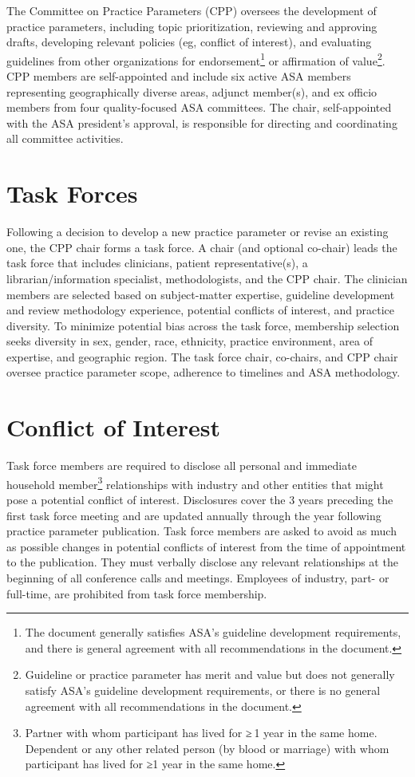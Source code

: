 \documentclass[
  letterpaper,
  DIV=11,
  numbers=noendperiod]{scrreprt}
\begin{document}
The Committee on Practice Parameters (CPP) oversees the development of
practice parameters, including topic prioritization, reviewing and
approving drafts, developing relevant policies (eg, conflict of
interest), and evaluating guidelines from other organizations for
endorsement\footnote{The document generally satisfies ASA's guideline
  development requirements, and there is general agreement with all
  recommendations in the document.} or affirmation of value\footnote{Guideline
  or practice parameter has merit and value but does not generally
  satisfy ASA's guideline development requirements, or there is no
  general agreement with all recommendations in the document.}. CPP
members are self-appointed and include six active ASA members
representing geographically diverse areas, adjunct member(s), and ex
officio members from four quality-focused ASA committees. The chair,
self-appointed with the ASA president's approval, is responsible for
directing and coordinating all committee activities.

\hypertarget{task-forces}{%
\section{Task Forces}\label{task-forces}}

Following a decision to develop a new practice parameter or revise an
existing one, the CPP chair forms a task force. A chair (and optional
co-chair) leads the task force that includes clinicians, patient
representative(s), a librarian/information specialist, methodologists,
and the CPP chair. The clinician members are selected based on
subject-matter expertise, guideline development and review methodology
experience, potential conflicts of interest, and practice diversity. To
minimize potential bias across the task force, membership selection
seeks diversity in sex, gender, race, ethnicity, practice environment,
area of expertise, and geographic region. The task force chair,
co-chairs, and CPP chair oversee practice parameter scope, adherence to
timelines and ASA methodology.

\hypertarget{conflict-of-interest}{%
\section{Conflict of Interest}\label{conflict-of-interest}}

Task force members are required to disclose all personal and immediate
household member\footnote{Partner with whom participant has lived for
  ≥ 1 year in the same home. Dependent or any other related person (by
  blood or marriage) with whom participant has lived for ≥1 year in the
  same home.} relationships with industry and other entities that might
pose a potential conflict of interest. Disclosures cover the 3 years
preceding the first task force meeting and are updated annually through
the year following practice parameter publication. Task force members
are asked to avoid as much as possible changes in potential conflicts of
interest from the time of appointment to the publication. They must
verbally disclose any relevant relationships at the beginning of all
conference calls and meetings. Employees of industry, part- or
full-time, are prohibited from task force membership.
\end{document}
